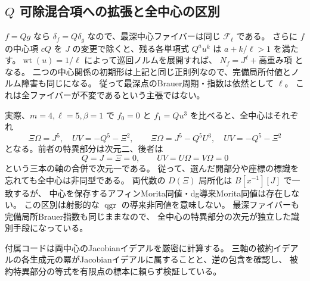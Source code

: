 \subsection{$Q$ 可除混合項への拡張と全中心の区別}

$f=Qg$ なら $\delta_f=Q\delta_g$ なので、最深中心ファイバーは同じ $\mathcal F_\ell$ である。
さらに $f$ の中心項 $cQ$ を $J$ の変更で除くと、残る各単項式 $Q^au^k$ は
$a+k/\ell>1$ を満たす。$\operatorname{wt}(u)=1/\ell$ によって巡回ノルムを展開すれば、
$N_f=J^\ell+\text{高重み項}$ となる。
二つの中心関係の初期形は上記と同じ正則列なので、完備局所付値とノルム障害も同じになる。
従って最深点のBrauer周期・指数は依然として $\ell$。
これは全ファイバーが不変であるという主張ではない。

実際、$m=4,\ell=5,\beta=1$ で $f_0=0$ と $f_1=Qu^3$ を比べると、全中心はそれぞれ
\[
 \Xi\Omega=J^5,\quad UV=-Q^5-\Xi^2,
 \qquad
 \Xi\Omega=J^5-Q^5U^3,\quad UV=-Q^5-\Xi^2
\]
となる。前者の特異部分は次元二、後者は
\[
 Q=J=\Xi=0,\qquad UV=U\Omega=V\Omega=0
\]
という三本の軸の合併で次元一である。
従って、選んだ開部分や座標の標識を忘れても全中心は非同型である。
両代数の $D(\Xi)$ 局所化は $B[x^{-1}][J]$ で一致するが、
中心を保存するアフィンMorita同値・dg導来Morita同値は存在しない。
この区別は射影的な $\operatorname{qgr}$ の導来非同値を意味しない。
最深ファイバーも完備局所Brauer指数も同じままなので、
全中心の特異部分の次元が独立した識別手段になっている。

付属コードは両中心のJacobianイデアルを厳密に計算する。
三軸の被約イデアルの各生成元の冪がJacobianイデアルに属することと、逆の包含を確認し、
被約特異部分の等式を有限点の標本に頼らず検証している。
